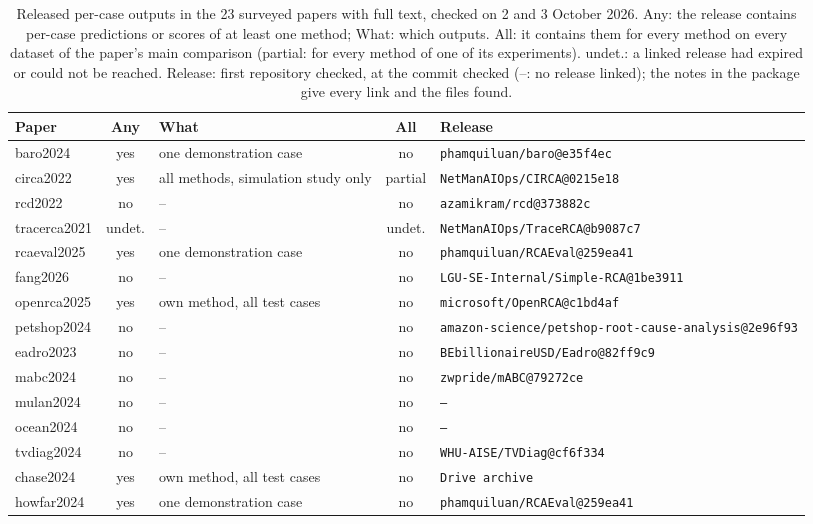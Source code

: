\begin{longtable}{lcp{2.7cm}cp{7.3cm}}
\caption{Released per-case outputs in the 23 surveyed papers with full text, checked on 2 and 3 October 2026. Any: the release contains per-case predictions or scores of at least one method; What: which outputs. All: it contains them for every method on every dataset of the paper's main comparison (partial: for every method of one of its experiments). undet.: a linked release had expired or could not be reached. Release: first repository checked, at the commit checked (--: no release linked); the notes in the package give every link and the files found.}\label{supp:release}\\
\toprule
Paper & Any & What & All & Release \\
\midrule
\endhead
baro2024 & yes & one demonstration case & no & \texttt{\scriptsize phamquiluan/baro@e35f4ec} \\
circa2022 & yes & all methods, simulation study only & partial & \texttt{\scriptsize NetManAIOps/CIRCA@0215e18} \\
rcd2022 & no & -- & no & \texttt{\scriptsize azamikram/rcd@373882c} \\
tracerca2021 & undet. & -- & undet. & \texttt{\scriptsize NetManAIOps/TraceRCA@b9087c7} \\
rcaeval2025 & yes & one demonstration case & no & \texttt{\scriptsize phamquiluan/RCAEval@259ea41} \\
fang2026 & no & -- & no & \texttt{\scriptsize LGU-SE-Internal/Simple-RCA@1be3911} \\
openrca2025 & yes & own method, all test cases & no & \texttt{\scriptsize microsoft/OpenRCA@c1bd4af} \\
petshop2024 & no & -- & no & \texttt{\scriptsize amazon-science/petshop-root-cause-analysis@2e96f93} \\
eadro2023 & no & -- & no & \texttt{\scriptsize BEbillionaireUSD/Eadro@82ff9c9} \\
mabc2024 & no & -- & no & \texttt{\scriptsize zwpride/mABC@79272ce} \\
mulan2024 & no & -- & no & \texttt{\scriptsize --} \\
ocean2024 & no & -- & no & \texttt{\scriptsize --} \\
tvdiag2024 & no & -- & no & \texttt{\scriptsize WHU-AISE/TVDiag@cf6f334} \\
chase2024 & yes & own method, all test cases & no & \texttt{\scriptsize Drive archive} \\
howfar2024 & yes & one demonstration case & no & \texttt{\scriptsize phamquiluan/RCAEval@259ea41} \\

\end{longtable}
